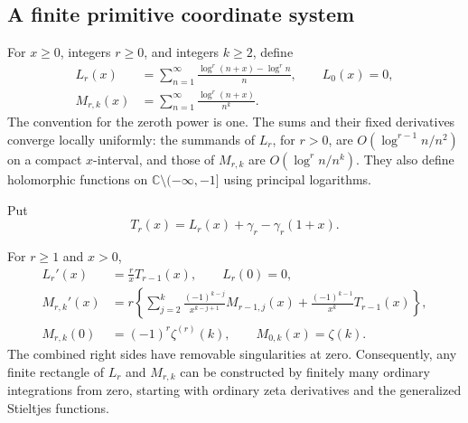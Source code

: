 \subsection{A finite primitive coordinate system}

For $x\ge0$, integers $r\ge0$, and integers $k\ge2$, define
\begin{align}
 L_r(x)&=\sum_{n=1}^{\infty}
   \frac{\log^r(n+x)-\log^r n}{n},\qquad L_0(x)=0,
       \label{mz:L}\\
 M_{r,k}(x)&=\sum_{n=1}^{\infty}
          \frac{\log^r(n+x)}{n^k}.
       \label{mz:M}
\end{align}
The convention for the zeroth power is one. The sums and their fixed
derivatives converge locally uniformly: the summands of $L_r$, for $r>0$,
are $O(\log^{r-1}n/n^2)$ on a compact $x$-interval, and those of $M_{r,k}$
are $O(\log^r n/n^k)$. They also define holomorphic functions on
$\mathbb C\setminus(-\infty,-1]$ using principal logarithms.

Put
\begin{equation}
 T_r(x)=L_r(x)+\gamma_r-\gamma_r(1+x).
 \label{mz:T}
\end{equation}

\begin{theorem}
\label{mz:thm:primitive}
For $r\ge1$ and $x>0$,
\begin{align}
 L_r'(x)&=\frac r{x}T_{r-1}(x),\qquad L_r(0)=0,
      \label{mz:Lrec}\\
 M_{r,k}'(x)
 &=r\left\{\sum_{j=2}^{k}
     \frac{(-1)^{k-j}}{x^{k-j+1}}M_{r-1,j}(x)
       +\frac{(-1)^{k-1}}{x^k}T_{r-1}(x)\right\},
      \label{mz:Mrec}\\
 M_{r,k}(0)&=(-1)^r\zeta^{(r)}(k),
       \qquad M_{0,k}(x)=\zeta(k).
      \label{mz:Minitial}
\end{align}
The combined right sides have removable singularities at zero.
Consequently, any finite rectangle of $L_r$ and $M_{r,k}$ can be
constructed by finitely many ordinary integrations from zero, starting
with ordinary zeta derivatives and the generalized Stieltjes functions.
\end{theorem}

